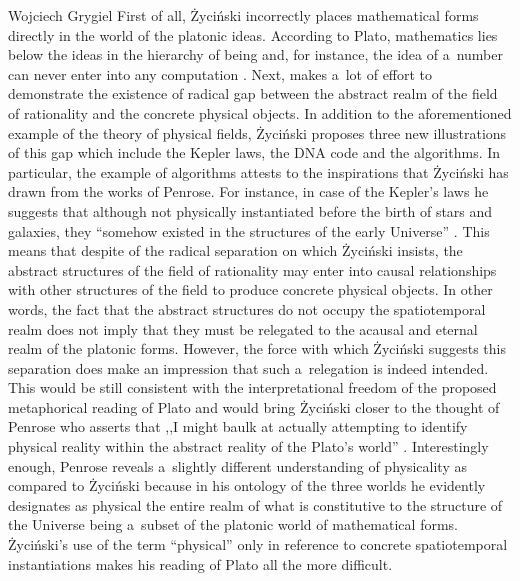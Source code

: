 \begin{artengenv}{Wojciech Grygiel}
First of all, Życiński incorrectly places mathematical forms directly in the world of the platonic ideas. According to Plato, mathematics lies below the ideas in the hierarchy of being and, for instance, the idea of a~number can never enter into any computation
\parencite[][pp.52–60]{shapiro_thinking_2000}. %
 Next, 
\parencite[][]{zycinski_poza_1991} %
 makes a~lot of effort to demonstrate the existence of radical gap between the abstract realm of the field of rationality and the concrete physical objects. In addition to the aforementioned example of the theory of physical fields, Życiński proposes three new illustrations of this gap which include the Kepler laws, the DNA code and the algorithms. In particular, the example of algorithms attests to the inspirations that Życiński has drawn from the works of Penrose. For instance, in case of the Kepler's laws he suggests that although not physically instantiated before the birth of stars and galaxies, they ``somehow existed in the structures of the early Universe'' 
\parencite[][p.71]{zycinski_poza_1991}. %
 This means that despite of the radical separation on which Życiński insists, the abstract structures of the field of rationality may enter into causal relationships with other structures of the field to produce concrete physical objects. In other words, the fact that the abstract structures do not occupy the spatiotemporal realm does not imply that they must be relegated to the acausal and eternal realm of the platonic forms. However, the force with which Życiński suggests this separation does make an impression that such a~relegation is indeed intended. This would be still consistent with the interpretational freedom of the proposed metaphorical reading of Plato and would bring Życiński closer to the thought of Penrose who asserts that ,,I might baulk at actually attempting to identify physical reality within the abstract reality of the Plato's world'' 
\parencite[][p.1029]{penrose_road_2005}. %
 Interestingly enough, Penrose reveals a~slightly different understanding of physicality as compared to Życiński because in his ontology of the three worlds he evidently designates as physical the entire realm of what is constitutive to the structure of the Universe being a~subset of the platonic world of mathematical forms. Życiński's use of the term ``physical'' only in reference to concrete spatiotemporal instantiations makes his reading of Plato all the more difficult.


\end{artengenv}
